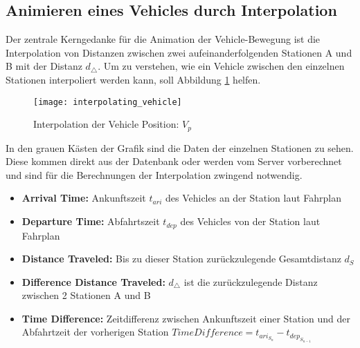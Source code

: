 \subsection{Animieren eines Vehicles durch Interpolation}
\label{sub:animieren_eines_vehicles_durch_interpolation}
  Der zentrale Kerngedanke für die Animation der Vehicle-Bewegung ist die Interpolation von Distanzen zwischen zwei aufeinanderfolgenden Stationen A und B mit der Distanz  $d_{\triangle}$. Um zu verstehen, wie ein Vehicle zwischen den einzelnen Stationen interpoliert werden kann, soll Abbildung \ref{fig:interpolating_vehicle} helfen.

  \begin{figure}[htbp]
    \begin{center}
      \texttt{[image: interpolating\_vehicle]}
      \caption{Interpolation der Vehicle Position: $V_p$}
      \label{fig:interpolating_vehicle}
    \end{center}
  \end{figure}

  In den grauen Kästen der Grafik sind die Daten der einzelnen Stationen zu sehen. Diese kommen direkt aus der Datenbank oder werden vom Server vorberechnet und sind für die Berechnungen der Interpolation zwingend notwendig.
  \begin{itemize}[label={}]
    \item \textbf{Arrival Time:} Ankunftszeit $t_{ari}$ des Vehicles an der Station laut Fahrplan

    \item \textbf{Departure Time:} Abfahrtszeit $t_{dep}$ des Vehicles von der Station laut Fahrplan

    \item \textbf{Distance Traveled:} Bis zu dieser Station zurückzulegende Gesamtdistanz $d_S$

    \item \textbf{Difference Distance Traveled:} $d_\triangle$ ist die zurückzulegende Distanz zwischen 2 Stationen A und B\footnotemark

    \item \textbf{Time Difference:} Zeitdifferenz zwischen Ankunftszeit einer Station und der Abfahrtzeit der vorherigen Station $ TimeDifference = t_{ari_{S_n}} - t_{dep_{S_{n-1}}}$

  \end{itemize}


